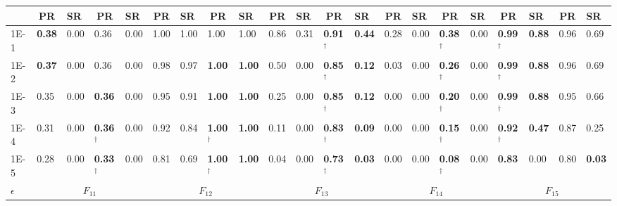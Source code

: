 \begin{table*}[h]
{\begin{tabular}{|p{4.8mm}|p{4.4mm}|p{4.4mm}|p{4.4mm}|p{4.4mm}|p{4.4mm}|p{4.4mm}|p{4.4mm}|p{4.4mm}|p{4.4mm}|p{4.4mm}|p{4.4mm}|p{4.4mm}|p{4.4mm}|p{4.4mm}|p{4.4mm}|p{4.4mm}|p{4.4mm}|p{4.4mm}|p{4.4mm}|p{4.4mm}|}
    \cline{2-21}
     & \multicolumn{1}{c|}{PR} & SR & \multicolumn{1}{c|}{PR} & SR & \multicolumn{1}{c|}{PR} & SR & \multicolumn{1}{c|}{PR} & SR & \multicolumn{1}{c|}{PR} & SR & \multicolumn{1}{c|}{PR} & SR & \multicolumn{1}{c|}{PR} & SR & \multicolumn{1}{c|}{PR} & SR & \multicolumn{1}{c|}{PR} & SR & \multicolumn{1}{c|}{PR} & SR \\
    \hline
    1E-1 & \textcolor{customred}{\textbf{0.38}} & 0.00 & 0.36 & 0.00 & 1.00 & 1.00 & 1.00 & 1.00 & 0.86 & 0.31 & \textcolor{customblue}{\textbf{0.91$^\dagger$}} & \textcolor{customblue}{\textbf{0.44}} & 0.28 & 0.00 & \textcolor{customblue}{\textbf{0.38$^\dagger$}} & 0.00 & \textcolor{customred}{\textbf{0.99$^\dagger$}} & \textcolor{customred}{\textbf{0.88}} & 0.96 & 0.69 \\
    1E-2 & \textcolor{customred}{\textbf{0.37}} & 0.00 & 0.36 & 0.00 & 0.98 & 0.97 & \textcolor{customblue}{\textbf{1.00}} & \textcolor{customblue}{\textbf{1.00}} & 0.50 & 0.00 & \textcolor{customblue}{\textbf{0.85$^\dagger$}} & \textcolor{customblue}{\textbf{0.12}} & 0.03 & 0.00 & \textcolor{customblue}{\textbf{0.26$^\dagger$}} & 0.00 & \textcolor{customred}{\textbf{0.99$^\dagger$}} & \textcolor{customred}{\textbf{0.88}} & 0.96 & 0.69 \\
    1E-3 & 0.35 & 0.00 & \textcolor{customblue}{\textbf{0.36}} & 0.00 & 0.95 & 0.91 & \textcolor{customblue}{\textbf{1.00}} & \textcolor{customblue}{\textbf{1.00}} & 0.25 & 0.00 & \textcolor{customblue}{\textbf{0.85$^\dagger$}} & \textcolor{customblue}{\textbf{0.12}} & 0.00 & 0.00 & \textcolor{customblue}{\textbf{0.20$^\dagger$}} & 0.00 & \textcolor{customred}{\textbf{0.99$^\dagger$}} & \textcolor{customred}{\textbf{0.88}} & 0.95 & 0.66 \\
    1E-4 & 0.31 & 0.00 & \textcolor{customblue}{\textbf{0.36$^\dagger$}} & 0.00 & 0.92 & 0.84 & \textcolor{customblue}{\textbf{1.00$^\dagger$}} & \textcolor{customblue}{\textbf{1.00}} & 0.11 & 0.00 & \textcolor{customblue}{\textbf{0.83$^\dagger$}} & \textcolor{customblue}{\textbf{0.09}} & 0.00 & 0.00 & \textcolor{customblue}{\textbf{0.15$^\dagger$}} & 0.00 & \textcolor{customred}{\textbf{0.92$^\dagger$}} & \textcolor{customred}{\textbf{0.47}} & 0.87 & 0.25 \\
    1E-5 & 0.28 & 0.00 & \textcolor{customblue}{\textbf{0.33$^\dagger$}} & 0.00 & 0.81 & 0.69 & \textcolor{customblue}{\textbf{1.00$^\dagger$}} & \textcolor{customblue}{\textbf{1.00}} & 0.04 & 0.00 & \textcolor{customblue}{\textbf{0.73$^\dagger$}} & \textcolor{customblue}{\textbf{0.03}} & 0.00 & 0.00 & \textcolor{customblue}{\textbf{0.08$^\dagger$}} & 0.00 & \textcolor{customred}{\textbf{0.83}} & 0.00 & 0.80 & \textcolor{customblue}{\textbf{0.03}} \\
    \hline
    \multirow{3}{*}{$\epsilon$} & \multicolumn{4}{c|}{$F_{11}$} & \multicolumn{4}{c|}{$F_{12}$} & \multicolumn{4}{c|}{$F_{13}$} & \multicolumn{4}{c|}{$F_{14}$} & \multicolumn{4}{c|}{$F_{15}$} \\


\end{tabular}}
\end{table*}
